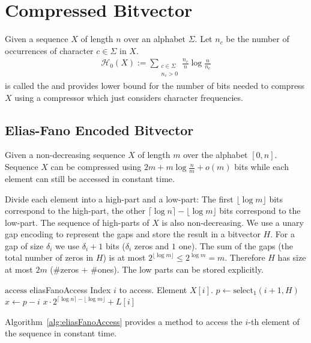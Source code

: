 \section{Compressed Bitvector}

\begin{Definition}
  Given a sequence $X$ of length $n$ over an alphabet $\Sigma$. Let $n_c$ be the number of occurrences of character $c \in \Sigma$ in $X$.
  \begin{align}
    \mathcal{H}_0(X) := \sum\limits_{\substack{c \in \Sigma\\ n_c > 0}} \frac{n_c}{n}\log\frac{n}{n_c}
  \end{align}
  is called the  and provides lower bound for the number of bits needed to compress $X$ using a compressor which just considers character frequencies.
\end{Definition}

\subsection{Elias-Fano Encoded Bitvector}

\begin{Theorem}
  \label{thm:eliasFanoEncoding}
  Given a non-decreasing sequence $X$ of length $m$ over the alphabet $[0,n]$. Sequence $X$ can be compressed using $2m + m\log\frac{n}{m} + o(m)$ bits while each element can still be accessed in constant time.
\end{Theorem}

\begin{Proof}
  Divide each element into a high-part and a low-part: The first $\lfloor \log m \rfloor$ bits correspond to the high-part, the other $\lceil \log n \rceil - \lfloor \log m \rfloor$ bits correspond to the low-part. The sequence of high-parts of $X$ is also non-decreasing. We use a unary gap encoding to represent the gaps and store the result in a bitvector $H$. For a gap of size $\delta_i$ we use $\delta_i + 1$ bits ($\delta_i$ zeros and $1$ one). The sum of the gaps (the total number of zeros in $H$) is at most $2^{\lfloor \log m \rfloor} \leq 2^{\log m} = m$. Therefore $H$ has size at most $2m$ (\#zeros + \#ones). The low parts can be stored explicitly.

  \begin{pseudocode}
    {$\mathrm{access}$}
    {eliasFanoAccess}
    {Index $i$ to access.}
    {Element $X[i]$.}
    \STATE $p \gets \mathrm{select}_1(i + 1, H)$
    \STATE $x \gets p - i$
    \RETURN $x \cdot 2^{\lceil\log n\rceil - \lfloor\log m\rfloor} + L[i]$
  \end{pseudocode}

  Algorithm~\ref{alg:eliasFanoAccess} provides a method to access the $i$-th element of the sequence in constant time.
\end{Proof}

